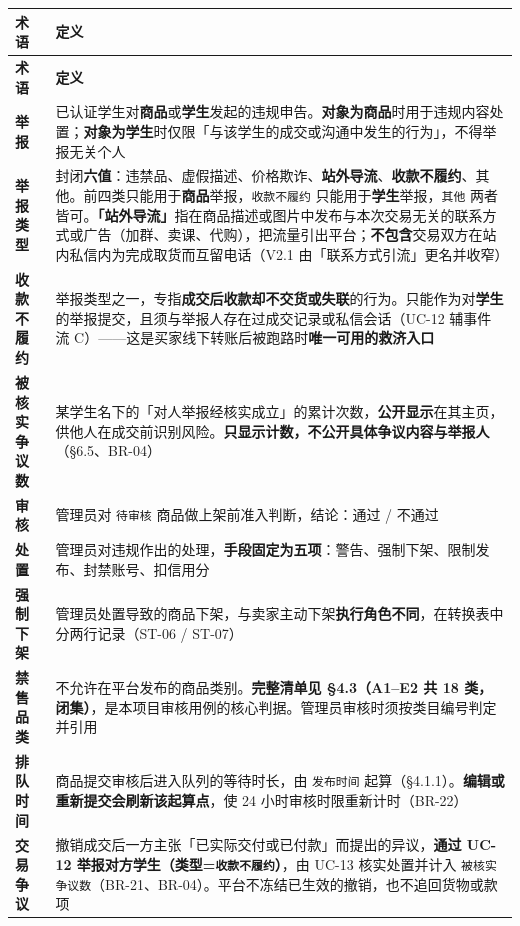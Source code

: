 \documentclass[12pt,a4paper]{ctexart}
\begin{document}
{\scriptsize
\begin{longtable}{|p{2.75cm}|p{13.25cm}|}
\hline
\textbf{术语} & \textbf{定义} \\
\hline
\endfirsthead
\hline
\textbf{术语} & \textbf{定义} \\
\hline
\endhead
\hline
\endfoot
\textbf{举报} & 已认证学生对\textbf{商品}或\textbf{学生}发起的违规申告。\textbf{对象为商品}时用于违规内容处置；\textbf{对象为学生}时仅限「与该学生的成交或沟通中发生的行为」，不得举报无关个人 \\
\hline
\textbf{举报类型} & 封闭\textbf{六值}：违禁品、虚假描述、价格欺诈、\textbf{站外导流}、\textbf{收款不履约}、其他。前四类只能用于\textbf{商品}举报，\texttt{收款不履约} 只能用于\textbf{学生}举报，\texttt{其他} 两者皆可。\textbf{「站外导流」}指在商品描述或图片中发布与本次交易无关的联系方式或广告（加群、卖课、代购），把流量引出平台；\textbf{不包含}交易双方在站内私信内为完成取货而互留电话（V2.1 由「联系方式引流」更名并收窄） \\
\hline
\textbf{收款不履约} & 举报类型之一，专指\textbf{成交后收款却不交货或失联}的行为。只能作为对\textbf{学生}的举报提交，且须与举报人存在过成交记录或私信会话（UC-12 辅事件流 C）——这是买家线下转账后被跑路时\textbf{唯一可用的救济入口} \\
\hline
\textbf{被核实争议数} & 某学生名下的「对人举报经核实成立」的累计次数，\textbf{公开显示}在其主页，供他人在成交前识别风险。\textbf{只显示计数，不公开具体争议内容与举报人}（§6.5、BR-04） \\
\hline
\textbf{审核} & 管理员对 \texttt{待审核} 商品做上架前准入判断，结论：通过 / 不通过 \\
\hline
\textbf{处置} & 管理员对违规作出的处理，\textbf{手段固定为五项}：警告、强制下架、限制发布、封禁账号、扣信用分 \\
\hline
\textbf{强制下架} & 管理员处置导致的商品下架，与卖家主动下架\textbf{执行角色不同}，在转换表中分两行记录（ST-06 / ST-07） \\
\hline
\textbf{禁售品类} & 不允许在平台发布的商品类别。\textbf{完整清单见 §4.3（A1–E2 共 18 类，闭集）}，是本项目审核用例的核心判据。管理员审核时须按类目编号判定并引用 \\
\hline
\textbf{排队时间} & 商品提交审核后进入队列的等待时长，由 \texttt{发布时间} 起算（§4.1.1）。\textbf{编辑或重新提交会刷新该起算点}，使 24 小时审核时限重新计时（BR-22） \\
\hline
\textbf{交易争议} & 撤销成交后一方主张「已实际交付或已付款」而提出的异议，\textbf{通过 UC-12 举报对方学生（类型=\texttt{收款不履约}）}，由 UC-13 核实处置并计入 \texttt{被核实争议数}（BR-21、BR-04）。平台不冻结已生效的撤销，也不追回货物或款项 \\
\hline
\end{longtable}
}
\end{document}
